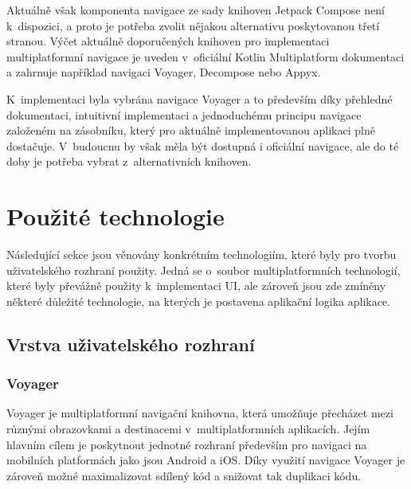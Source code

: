 \medskip

Aktuálně však komponenta navigace ze sady knihoven Jetpack Compose není k~dispozici, a proto je potřeba zvolit nějakou alternativu poskytovanou
třetí stranou. \cite{composeNav} Výčet aktuálně doporučených knihoven pro implementaci multiplatformní navigace je uveden v~oficiální Kotlin 
Multiplatform dokumentaci a zahrnuje například navigaci Voyager, Decompose nebo Appyx. 

\medskip

K~implementaci byla vybrána navigace Voyager a 
to především díky přehledné dokumentaci, intuitivní implementaci a jednoduchému principu navigace založeném na zásobníku, který pro aktuálně
implementovanou aplikaci plně dostačuje. V~budoucnu by však měla být dostupná i oficiální navigace, ale do té doby je potřeba vybrat z~alternativních knihoven.

\section{Použité technologie}
Následující sekce jsou věnovány konkrétním technologiím, které byly pro tvorbu uživatelského rozhraní použity.
Jedná se o~soubor multiplatformních technologií, které byly převážně použity k~implementaci UI, ale zároveň jsou zde zmíněny některé 
důležité technologie, na kterých je postavena aplikační logika aplikace.

\subsection{Vrstva uživatelského rozhraní}

\subsubsection*{Voyager}
Voyager je multiplatformní navigační knihovna, která umožňuje přecházet mezi různými obrazovkami a destinacemi v~multiplatformních
aplikacích. \cite{voyager} Jejím hlavním cílem je poskytnout jednotné rozhraní především pro navigaci na mobilních platformách jako 
jsou Android a iOS. Díky využití navigace Voyager je zároveň možné maximalizovat sdílený kód a snižovat tak duplikaci kódu.

\medskip

